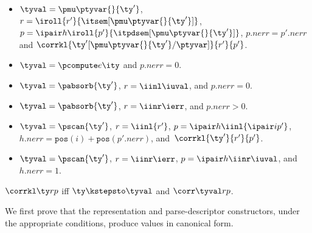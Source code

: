 \begin{definition}
\begin{itemize}
  \item $\tyval = \pmu \ptyvar {} {\ty'}$, 
    $r = \iroll{r'}{\itsem[\pmu \ptyvar {} {\ty'}]}$, $p =
    \ipair h {\iroll{p'}{
                \itpdsem[\pmu \ptyvar {} {\ty'}]}}$, 
        $p.{nerr} = p'.{nerr}$ 
    and \linebreak
    $\corrkl {\ty'[\pmu \ptyvar {} {\ty'}/\ptyvar]} {r'} {p'}$.
  \item $\tyval = \pcompute e \ity$ and $p.{nerr} = 0$.
  \item $\tyval = \pabsorb {\ty'}$, $r = \iinl \iuval$, and $p.nerr = 0$.
  \item $\tyval = \pabsorb {\ty'}$, $r = \iinr \ierr$, and $p.nerr > 0$.
  \item $\tyval = \pscan {\ty'}$, $r =\iinl {r'}$,
      $p = \ipair h {\iinl {\ipair i {p'}}}$,
      $h.nerr = \mathtt{pos}(i) + \mathtt{pos}(p'.nerr)$, and \linebreak
      $\, \corrkl {\ty'}{r'}{p'}$.
  \item $\tyval = \pscan {\ty'}$,
      $r =\iinr \ierr$,
      $p = \ipair h {\iinr \iuval}$, and
      $h.{nerr} = 1$.
  \end{itemize}
\end{definition}

\begin{definition}
$\corrkl \ty r p$ iff $\ty \kstepsto \tyval$ and $\corr \tyval r p$.
\label{def:canon-forms-II}
\end{definition}

We first prove that the representation and parse-descriptor constructors, under the appropriate
conditions, produce values in canonical form.

